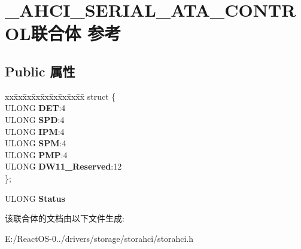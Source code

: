 \hypertarget{union___a_h_c_i___s_e_r_i_a_l___a_t_a___c_o_n_t_r_o_l}{}\section{\+\_\+\+A\+H\+C\+I\+\_\+\+S\+E\+R\+I\+A\+L\+\_\+\+A\+T\+A\+\_\+\+C\+O\+N\+T\+R\+O\+L联合体 参考}
\label{union___a_h_c_i___s_e_r_i_a_l___a_t_a___c_o_n_t_r_o_l}
\subsection*{Public 属性}
\begin{DoxyCompactItemize}
\item 
\mbox{\label{union___a_h_c_i___s_e_r_i_a_l___a_t_a___c_o_n_t_r_o_l_a7fab388762aa3b17fc845389c12e41f1}} 
\begin{tabbing}
xx\=xx\=xx\=xx\=xx\=xx\=xx\=xx\=xx\=\kill
struct \{\\
\>ULONG {\bfseries DET}:4\\
\>ULONG {\bfseries SPD}:4\\
\>ULONG {\bfseries IPM}:4\\
\>ULONG {\bfseries SPM}:4\\
\>ULONG {\bfseries PMP}:4\\
\>ULONG {\bfseries DW11\_Reserved}:12\\
\}; \\

\end{tabbing}\item 
\mbox{\label{union___a_h_c_i___s_e_r_i_a_l___a_t_a___c_o_n_t_r_o_l_ad5433b68b8c06f8734d321de283eec07}} 
U\+L\+O\+NG {\bfseries Status}
\end{DoxyCompactItemize}


该联合体的文档由以下文件生成\+:\begin{DoxyCompactItemize}
\item 
E\+:/\+React\+O\+S-\/0../drivers/storage/storahci/storahci.\+h\end{DoxyCompactItemize}
